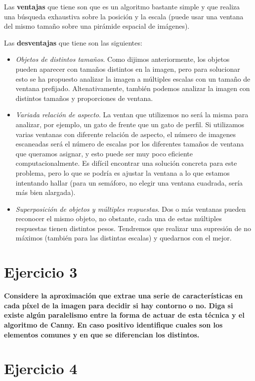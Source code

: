 \documentclass[11pt,a4paper]{article}
\begin{document}
Las \textbf{ventajas} que tiene son que es un algoritmo bastante simple y que realiza una búsqueda exhaustiva sobre la posición y la escala (puede usar
una ventana del mismo tamaño sobre una pirámide espacial de imágenes).

Las \textbf{desventajas} que tiene son las siguientes:
\begin{itemize}
	\item \textit{Objetos de distintos tamaños}. Como dijimos anteriormente, los objetos pueden aparecer con tamaños distintos en la imagen, pero para
		  solucionar esto se ha propuesto analizar la imagen a múltiples escalas con un tamaño de ventana prefijado. Altenativamente, también podemos analizar
		  la imagen con distintos tamaños y proporciones de ventana.
	\item \textit{Variada relación de aspecto}. La ventan que utilizemos no será la misma para analizar, por ejemplo, un gato de frente que un gato de perfil.
		  Si utilizamos varias ventanas con diferente relación de aspecto, el número de imagenes escaneadas será el número de escalas por los diferentes tamaños
		  de ventana que queramos asignar, y esto puede ser muy poco eficiente computacionalmente. Es difícil encontrar una solución concreta para este problema,
		  pero lo que se podría es ajustar la ventana a lo que estamos intentando hallar (para un semáforo, no elegir una ventana cuadrada, sería más bien
		  alargada).
	\item \textit{Superposición de objetos y múltiples respuestas}. Dos o más ventanas pueden reconocer el mismo objeto, no obstante, cada una de estas múltiples
		  respuestas tienen distintos pesos. Tendremos que realizar una supresión de no máximos (también para las distintas escalas) y quedarnos con el mejor.
\end{itemize}


\section*{Ejercicio 3}

\textbf{Considere la aproximación que extrae una serie de características en cada píxel de la imagen para decidir si hay contorno o no. Diga si existe algún
paralelismo entre la forma de actuar de esta técnica y el algoritmo de Canny. En caso positivo identifique cuales son los elementos comunes y en que se
diferencian los distintos.}




\section*{Ejercicio 4}
\end{document}
